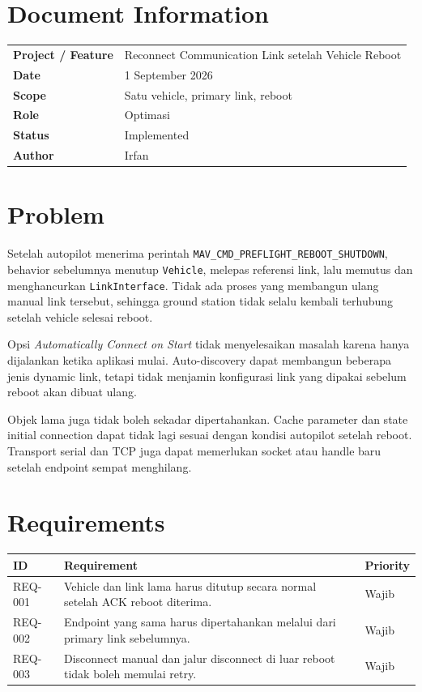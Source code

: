 \documentclass[11pt,a4paper]{article}
\begin{document}
\section*{Document Information}

\begin{tabularx}{\textwidth}{>{\bfseries}l Y}
Project / Feature & Reconnect Communication Link setelah Vehicle Reboot \\
Date & 1 September 2026 \\
Scope & Satu vehicle, primary link, reboot \\
Role & Optimasi \\
Status & Implemented \\
Author & Irfan \\
\end{tabularx}

\vspace{1em}

\section{Problem}

Setelah autopilot menerima perintah
\nolinkurl{MAV_CMD_PREFLIGHT_REBOOT_SHUTDOWN}, behavior sebelumnya menutup
\texttt{Vehicle}, melepas referensi link, lalu memutus dan menghancurkan
\texttt{LinkInterface}. Tidak ada proses yang membangun ulang manual link tersebut,
sehingga ground station tidak selalu kembali terhubung setelah vehicle selesai
reboot.

Opsi \emph{Automatically Connect on Start} tidak menyelesaikan masalah karena hanya
dijalankan ketika aplikasi mulai. Auto-discovery dapat membangun beberapa jenis
dynamic link, tetapi tidak menjamin konfigurasi link yang dipakai sebelum reboot
akan dibuat ulang.

Objek lama juga tidak boleh sekadar dipertahankan. Cache parameter dan state
initial connection dapat tidak lagi sesuai dengan kondisi autopilot setelah reboot.
Transport serial dan TCP juga dapat memerlukan socket atau handle baru setelah
endpoint sempat menghilang.

\section{Requirements}

\begin{table}[H]
\centering
\begin{tabularx}{\textwidth}{l Y l}
\toprule
\textbf{ID} & \textbf{Requirement} & \textbf{Priority} \\
\midrule
REQ-001 &
Vehicle dan link lama harus ditutup secara normal setelah ACK reboot diterima. &
Wajib \\
\midrule
REQ-002 &
Endpoint yang sama harus dipertahankan melalui dari
primary link sebelumnya. &
Wajib \\
\midrule
REQ-003 &
Disconnect manual dan jalur disconnect di luar reboot tidak boleh memulai retry. &
Wajib \\
\bottomrule
\end{tabularx}
\end{table}
\end{document}
